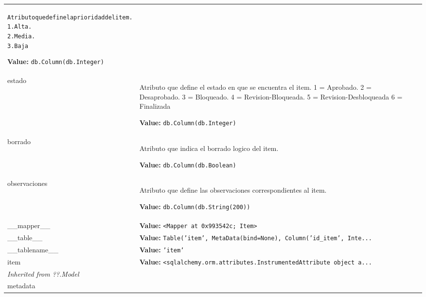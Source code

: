 \begin{longtable}{|p{\varnamewidth}|p{\vardescrwidth}|l}
\begin{alltt}
Atributo que define la prioridad del item.
1. Alta.
2. Media.
3. Baja
\end{alltt}

\textbf{Value:} 
{\tt db.Column(db.Integer)}&\\
\cline{1-2}
\raggedright e\-s\-t\-a\-d\-o\- & \raggedright Atributo que define el estado en que se encuentra el item. 1 = 
          Aprobado. 2 = Desaprobado. 3 = Bloqueado. 4 = Revision-Bloqueada.
          5 = Revision-Desbloqueada 6 = Finalizada

\textbf{Value:} 
{\tt db.Column(db.Integer)}&\\
\cline{1-2}
\raggedright b\-o\-r\-r\-a\-d\-o\- & \raggedright Atributo que indica el borrado logico del item.

\textbf{Value:} 
{\tt db.Column(db.Boolean)}&\\
\cline{1-2}
\raggedright o\-b\-s\-e\-r\-v\-a\-c\-i\-o\-n\-e\-s\- & \raggedright Atributo que define las observaciones correspondientes al item.

\textbf{Value:} 
{\tt db.Column(db.String(200))}&\\
\cline{1-2}
\raggedright \_\-\_\-m\-a\-p\-p\-e\-r\-\_\-\_\- & \raggedright \textbf{Value:} 
{\tt {\textless}Mapper at 0x993542c; Item{\textgreater}}&\\
\cline{1-2}
\raggedright \_\-\_\-t\-a\-b\-l\-e\-\_\-\_\- & \raggedright \textbf{Value:} 
{\tt Table('item', MetaData(bind=None), Column('id\_item', Inte\texttt{...}}&\\
\cline{1-2}
\raggedright \_\-\_\-t\-a\-b\-l\-e\-n\-a\-m\-e\-\_\-\_\- & \raggedright \textbf{Value:} 
{\tt \texttt{'}\texttt{item}\texttt{'}}&\\
\cline{1-2}
\raggedright i\-t\-e\-m\- & \raggedright \textbf{Value:} 
{\tt {\textless}sqlalchemy.orm.attributes.InstrumentedAttribute object a\texttt{...}}&\\
\cline{1-2}
\multicolumn{2}{|l|}{\textit{Inherited from ??.Model}}\\
\multicolumn{2}{|p{\varwidth}|}{\raggedright metadata}\\
\cline{1-2}
\end{longtable}

